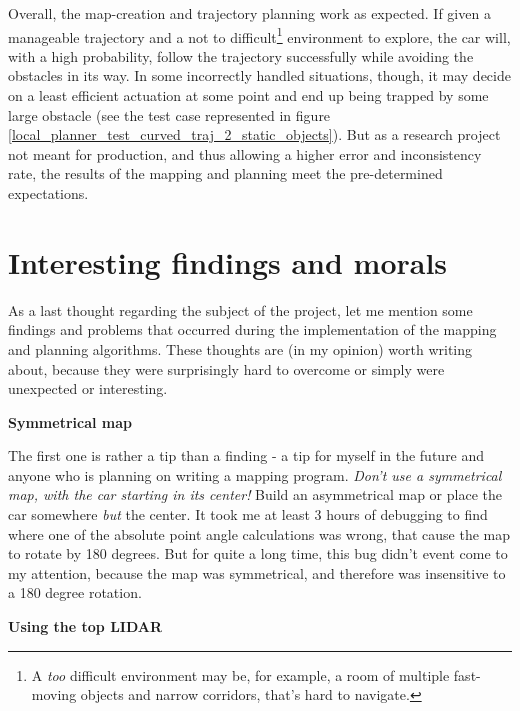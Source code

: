 Overall, the map-creation and trajectory planning work as expected. If given a manageable trajectory and a not to difficult\footnote{A \textit{too} difficult environment may be, for example, a room of multiple fast-moving objects and narrow corridors, that's hard to navigate.} environment to explore, the car will, with a high probability, follow the trajectory successfully while avoiding the obstacles in its way. In some incorrectly handled situations, though, it may decide on a least efficient actuation at some point and end up being trapped by some large obstacle (see the test case represented in figure \ref{local_planner_test_curved_traj_2_static_objects}). But as a research project not meant for production, and thus allowing a higher error and inconsistency rate, the results of the mapping and planning meet the pre-determined expectations.

\section{Interesting findings and morals}
As a last thought regarding the subject of the project, let me mention some findings and problems that occurred during the implementation of the mapping and planning algorithms. These thoughts are (in my opinion) worth writing about, because they were surprisingly hard to overcome or simply were unexpected or interesting.

\textbf{Symmetrical map}

The first one is rather a tip than a finding - a tip for myself in the future and anyone who is planning on writing a mapping program. \textit{Don't use a symmetrical map, with the car starting in its center!} Build an asymmetrical map or place the car somewhere \textit{but} the center. It took me at least 3 hours of debugging to find where one of the absolute point angle calculations was wrong, that cause the  map to rotate by 180 degrees. But for quite a long time, this bug didn't event come to my attention, because the map was symmetrical, and therefore was insensitive to a 180 degree rotation.

\textbf{Using the top LIDAR}

